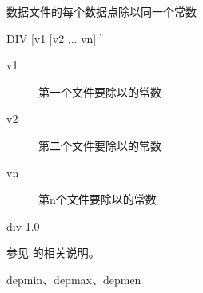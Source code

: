 \label{cmd:div}

数据文件的每个数据点除以同一个常数

\begin{SACSTX}
DIV [v1 [v2 ... vn] ]
\end{SACSTX}

\begin{description}
\item [v1] 第一个文件要除以的常数
\item [v2] 第二个文件要除以的常数
\item [vn] 第n个文件要除以的常数
\end{description}

\begin{SACDFT}
div 1.0
\end{SACDFT}

参见  的相关说明。

depmin、depmax、depmen

